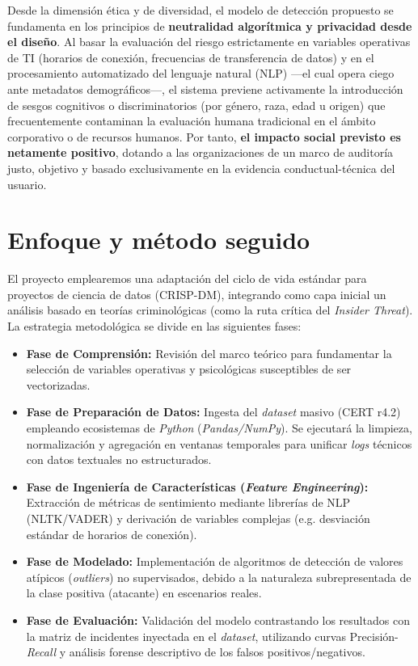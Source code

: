 \documentclass[IB]{TFUOC}%
\begin{document}
\medskip
\noindent Desde la dimensión ética y de diversidad, el modelo de detección propuesto se fundamenta en los principios de \textbf{neutralidad algorítmica y privacidad desde el diseño}. Al basar la evaluación del riesgo estrictamente en variables operativas de TI (horarios de conexión, frecuencias de transferencia de datos) y en el procesamiento automatizado del lenguaje natural (NLP) —el cual opera ciego ante metadatos demográficos—, el sistema previene activamente la introducción de sesgos cognitivos o discriminatorios (por género, raza, edad u origen) que frecuentemente contaminan la evaluación humana tradicional en el ámbito corporativo o de recursos humanos. Por tanto,\textbf{ el impacto social previsto es netamente positivo}, dotando a las organizaciones de un marco de auditoría justo, objetivo y basado exclusivamente en la evidencia conductual-técnica del usuario.


\section{Enfoque y método seguido}

El proyecto emplearemos una adaptación del ciclo de vida estándar para proyectos de ciencia de datos (CRISP-DM), integrando como capa inicial un análisis basado en teorías criminológicas (como la ruta crítica del \textit{Insider Threat}). La estrategia metodológica se divide en las siguientes fases:

\begin{itemize}
    \item \textbf{Fase de Comprensión:} Revisión del marco teórico para fundamentar la selección de variables operativas y psicológicas susceptibles de ser vectorizadas.
    \item \textbf{Fase de Preparación de Datos:} Ingesta del \textit{dataset} masivo (CERT r4.2) empleando ecosistemas de \textit{Python} (\textit{Pandas/NumPy}). Se ejecutará la limpieza, normalización y agregación en ventanas temporales para unificar \textit{logs} técnicos con datos textuales no estructurados.
    \item \textbf{Fase de Ingeniería de Características (\textit{Feature Engineering}):} Extracción de métricas de sentimiento mediante librerías de NLP (NLTK/VADER) y derivación de variables complejas (e.g. desviación estándar de horarios de conexión).
    \item \textbf{Fase de Modelado:} Implementación de algoritmos de detección de valores atípicos (\textit{outliers}) no supervisados, debido a la naturaleza subrepresentada de la clase positiva (atacante) en escenarios reales.
    \item \textbf{Fase de Evaluación:} Validación del modelo contrastando los resultados con la matriz de incidentes inyectada en el \textit{dataset}, utilizando curvas Precisión-\textit{Recall} y análisis forense descriptivo de los falsos positivos/negativos.
\end{itemize}
\end{document}
